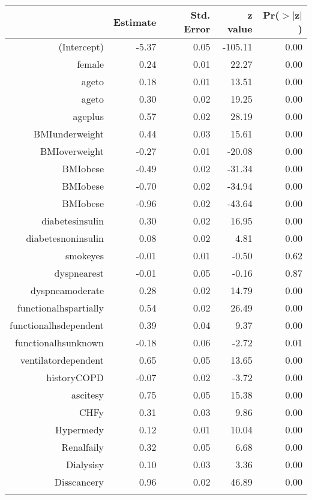 \bigskip\bigskip
\centering
\begin{tabular}{rrrrr}
  \hline
 & Estimate & Std. Error & z value & Pr($>$$|$z$|$) \\ 
  \hline
(Intercept) & -5.37 & 0.05 & -105.11 & 0.00 \\ 
  female & 0.24 & 0.01 & 22.27 & 0.00 \\ 
  age\-65\-to\-74 & 0.18 & 0.01 & 13.51 & 0.00 \\ 
  age\-75\-to\-84 & 0.30 & 0.02 & 19.25 & 0.00 \\ 
  age\-85\-plus & 0.57 & 0.02 & 28.19 & 0.00 \\ 
  BMI\-underweight & 0.44 & 0.03 & 15.61 & 0.00 \\ 
  BMI\-overweight & -0.27 & 0.01 & -20.08 & 0.00 \\ 
  BMI\-obese\-1 & -0.49 & 0.02 & -31.34 & 0.00 \\ 
  BMI\-obese\-2 & -0.70 & 0.02 & -34.94 & 0.00 \\ 
  BMI\-obese\-3 & -0.96 & 0.02 & -43.64 & 0.00 \\ 
  diabetes\-insulin & 0.30 & 0.02 & 16.95 & 0.00 \\ 
  diabetes\-noninsulin & 0.08 & 0.02 & 4.81 & 0.00 \\ 
  smoke\-yes & -0.01 & 0.01 & -0.50 & 0.62 \\ 
  dyspnea\-rest & -0.01 & 0.05 & -0.16 & 0.87 \\ 
  dyspnea\-moderate & 0.28 & 0.02 & 14.79 & 0.00 \\ 
  functional\-hs\-partially & 0.54 & 0.02 & 26.49 & 0.00 \\ 
  functional\-hs\-dependent & 0.39 & 0.04 & 9.37 & 0.00 \\ 
  functional\-hs\-unknown & -0.18 & 0.06 & -2.72 & 0.01 \\ 
  ventilator\-dependent & 0.65 & 0.05 & 13.65 & 0.00 \\ 
  history\-COPD & -0.07 & 0.02 & -3.72 & 0.00 \\ 
  ascites\-y & 0.75 & 0.05 & 15.38 & 0.00 \\ 
  CHF\-y & 0.31 & 0.03 & 9.86 & 0.00 \\ 
  Hyper\-med\-y & 0.12 & 0.01 & 10.04 & 0.00 \\ 
  Renal\-fail\-y & 0.32 & 0.05 & 6.68 & 0.00 \\ 
  Dialysis\-y & 0.10 & 0.03 & 3.36 & 0.00 \\ 
  Diss\-cancer\-y & 0.96 & 0.02 & 46.89 & 0.00 \\ 
$$
\end{tabular}
